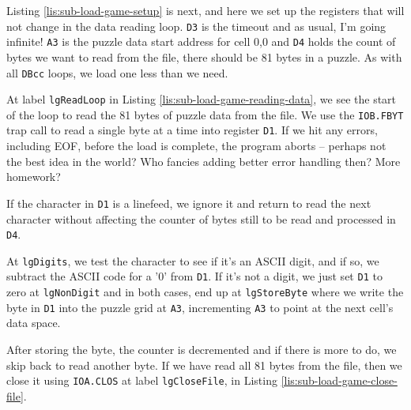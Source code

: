 Listing \ref{lis:sub-load-game-setup} is next, and here we set up
the registers that will not change in the data reading loop. \texttt{D3}
is the timeout and as usual, I'm going infinite! \texttt{A3} is the
puzzle data start address for cell 0,0 and \texttt{D4} holds the count
of bytes we want to read from the file, there should be 81 bytes in
a puzzle. As with all \texttt{DBcc} loops, we load one less than we
need.



At label \texttt{lgReadLoop} in Listing \ref{lis:sub-load-game-reading-data},
we see the start of the loop to read the 81 bytes of puzzle data from
the file. We use the \texttt{IOB.FBYT} trap call to read a single
byte at a time into register \texttt{D1}. If we hit any errors, including
EOF, before the load is complete, the program aborts -- perhaps not
the best idea in the world? Who fancies adding better error handling
then? More homework?

If the character in \texttt{D1} is a linefeed, we ignore it and return
to read the next character without affecting the counter of bytes
still to be read and processed in \texttt{D4}.



At \texttt{lgDigits}, we test the character to see if it's an ASCII
digit, and if so, we subtract the ASCII code for a '0' from \texttt{D1}.
If it's not a digit, we just set \texttt{D1} to zero at \texttt{lgNonDigit}
and in both cases, end up at \texttt{lgStoreByte} where we write the
byte in \texttt{D1} into the puzzle grid at \texttt{A3}, incrementing
\texttt{A3} to point at the next cell's data space.

After storing the byte, the counter is decremented and if there is
more to do, we skip back to read another byte. If we have read all
81 bytes from the file, then we close it using \texttt{IOA.CLOS} at
label \texttt{lgCloseFile}, in Listing \ref{lis:sub-load-game-close-file}.



